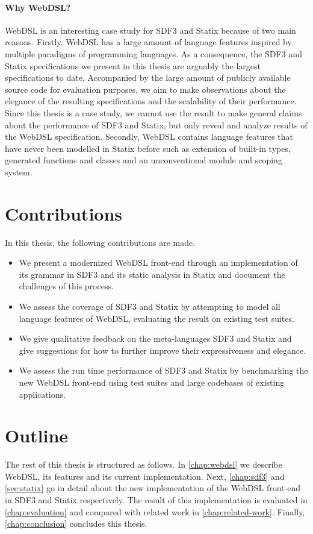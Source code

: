     \paragraph{Why WebDSL?} WebDSL is an interesting case study for SDF3 and Statix because of two main reasons. Firstly, WebDSL has a large amount of language features inspired by multiple paradigms of programming languages. As a consequence, the SDF3 and Statix specifications we present in this thesis are arguably the largest specifications to date. Accompanied by the large amount of publicly available source code for evaluation purposes, we aim to make observations about the elegance of the resulting specifications and the scalability of their performance. Since this thesis is a case study, we cannot use the result to make general claims about the performance of SDF3 and Statix, but only reveal and analyze results of the WebDSL specification. Secondly, WebDSL contains language features that have never been modelled in Statix before such as extension of built-in types, generated functions and classes and an unconventional module and scoping system.

  \section{\label{sec:contributions}Contributions}

    In this thesis, the following contributions are made.

    \begin{itemize}
      \item We present a modernized WebDSL front-end through an implementation of its grammar in SDF3 and its static analysis in Statix and document the challenges of this process.
      \item We assess the coverage of SDF3 and Statix by attempting to model all language features of WebDSL, evaluating the result on existing test suites.
      \item We give qualitative feedback on the meta-languages SDF3 and Statix and give suggestions for how to further improve their expressiveness and elegance.
      \item We assess the run time performance of SDF3 and Statix by benchmarking the new WebDSL front-end using test suites and large codebases of existing applications.
    \end{itemize}

  \section{\label{sec:outline}Outline}
    The rest of this thesis is structured as follows. In \cref{chap:webdsl} we describe WebDSL, its features and its current implementation. Next, \cref{chap:sdf3} and \cref{sec:statix} go in detail about the new implementation of the WebDSL front-end in SDF3 and Statix respectively. The result of this implementation is evaluated in \cref{chap:evaluation} and compared with related work in \cref{chap:related-work}. Finally, \cref{chap:conclusion} concludes this thesis.
